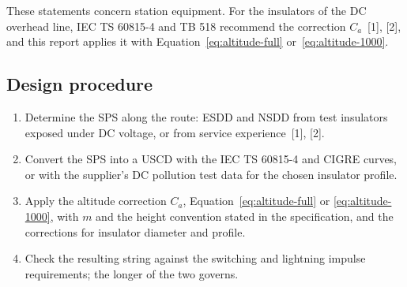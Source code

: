 These statements concern station equipment. For the insulators of the DC
overhead line, IEC TS 60815-4 and TB 518 recommend the correction
$C_{a}$~[1], [2], and this report applies it with
Equation~\eqref{eq:altitude-full} or~\eqref{eq:altitude-1000}.


\subsection{Design procedure}
\label{sec:creepage-procedure}

\begin{enumerate}[itemsep=0.2em]
  \item Determine the SPS along the route: ESDD and NSDD from test insulators
        exposed under DC voltage, or from service experience~[1], [2].
  \item Convert the SPS into a USCD with the IEC TS 60815-4 and CIGRE curves,
        or with the supplier's DC pollution test data for the chosen
        insulator profile.
  \item Apply the altitude correction $C_{a}$,
        Equation~\eqref{eq:altitude-full} or \eqref{eq:altitude-1000}, with
        $m$ and the height convention stated in the specification, and the
        corrections for insulator diameter and profile.
  \item Check the resulting string against the switching and lightning
        impulse requirements; the longer of the two governs.
\end{enumerate}
